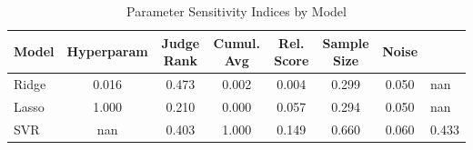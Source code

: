 
\begin{table}[h]
\centering
\caption{Parameter Sensitivity Indices by Model}
\label{tab:sensitivity_indices}
\begin{tabular}{l c c c c c c}
\toprule
\textbf{Model} & \textbf{Hyperparam} & \textbf{Judge Rank} & \textbf{Cumul. Avg} & \textbf{Rel. Score} & \textbf{Sample Size} & \textbf{Noise} \\
\midrule
Ridge & 0.016 & 0.473 & 0.002 & 0.004 & 0.299 & 0.050 & nan \\
Lasso & 1.000 & 0.210 & 0.000 & 0.057 & 0.294 & 0.050 & nan \\
SVR & nan & 0.403 & 1.000 & 0.149 & 0.660 & 0.060 & 0.433 \\
\bottomrule
\end{tabular}
\end{table}

